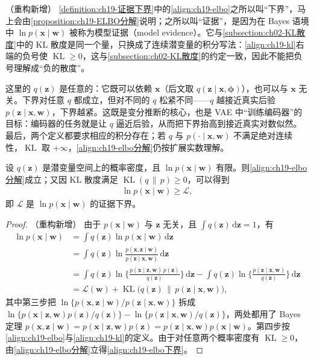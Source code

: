 \documentclass[../../main.tex]{subfiles}
\begin{document}
\begin{remark}（重构新增）
\cref{definition:ch19-证据下界}中的\eqref{align:ch19-elbo}之所以叫“下界”，马上会由\cref{proposition:ch19-ELBO分解}说明；之所以叫“证据”，是因为在 Bayes 语境中 $\ln p(\bm{x}\mid\bm{w})$ 被称为模型证据（model evidence）。它与\cref{subsection:ch02-KL散度}中的 KL 散度是同一个量，只换成了连续潜变量的积分写法：\eqref{align:ch19-kl}右端的负号使 $\operatorname{KL}\geqslant0$，这与\cref{subsection:ch02-KL散度}的约定一致，因此不能把负号理解成“负的散度”。

这里的 $q(\bm{z})$ 是任意的：它既可以依赖 $\bm{x}$（后文取 $q(\bm{z}\mid\bm{x},\bm{\phi})$），也可以与 $\bm{x}$ 无关。下界对任意 $q$ 都成立，但对不同的 $q$ 松紧不同——$q$ 越接近真实后验 $p(\bm{z}\mid\bm{x},\bm{w})$，下界越紧。这既是变分推断的核心，也是 VAE 中“训练编码器”的目标：编码器的任务就是让 $q$ 逼近后验，从而把下界抬高到接近真实对数似然。最后，两个定义都要求相应的积分存在；若 $q$ 与 $p(\cdot\mid\bm{x},\bm{w})$ 不满足绝对连续性，$\operatorname{KL}$ 取 $+\infty$，\eqref{align:ch19-elbo分解}仍按扩展实数理解。
\end{remark}

\begin{proposition}[证据下界分解]\label{proposition:ch19-ELBO分解}
设 $q(\bm{z})$ 是潜变量空间上的概率密度，且 $\ln p(\bm{x}\mid\bm{w})$ 有限。则\eqref{align:ch19-elbo分解}成立；又因 KL 散度满足 $\operatorname{KL}(q\,\|\,p)\geqslant0$，可以得到
\begin{align}
\ln p(\bm{x}\mid\bm{w})\geqslant\mathcal{L},
\label{align:ch19-elbo下界}
\end{align}
即 $\mathcal{L}$ 是 $\ln p(\bm{x}\mid\bm{w})$ 的证据下界。
\end{proposition}
\begin{proof}（重构新增）
由于 $p(\bm{x}\mid\bm{w})$ 与 $\bm{z}$ 无关，且 $\int q(\bm{z})\,\mathrm{d}\bm{z}=1$，有
\begin{align*}
\ln p(\bm{x}\mid\bm{w})&=\int q(\bm{z})\ln p(\bm{x}\mid\bm{w})\,\mathrm{d}\bm{z}\\
&=\int q(\bm{z})\ln\frac{p(\bm{x},\bm{z}\mid\bm{w})}{p(\bm{z}\mid\bm{x},\bm{w})}\,\mathrm{d}\bm{z}\\
&=\int q(\bm{z})\ln\Big\{\frac{p(\bm{x}\mid\bm{z},\bm{w})\,p(\bm{z})}{q(\bm{z})}\Big\}\,\mathrm{d}\bm{z}-\int q(\bm{z})\ln\Big\{\frac{p(\bm{z}\mid\bm{x},\bm{w})}{q(\bm{z})}\Big\}\,\mathrm{d}\bm{z}\\
&=\mathcal{L}(\bm{w})+\operatorname{KL}\big(q(\bm{z})\,\|\,p(\bm{z}\mid\bm{x},\bm{w})\big),
\end{align*}
其中第三步把 $\ln\{p(\bm{x},\bm{z}\mid\bm{w})/p(\bm{z}\mid\bm{x},\bm{w})\}$ 拆成 $\ln\{p(\bm{x}\mid\bm{z},\bm{w})p(\bm{z})/q(\bm{z})\}-\ln\{p(\bm{z}\mid\bm{x},\bm{w})/q(\bm{z})\}$，两处都用了 Bayes 定理 $p(\bm{x},\bm{z}\mid\bm{w})=p(\bm{x}\mid\bm{z},\bm{w})p(\bm{z})=p(\bm{z}\mid\bm{x},\bm{w})p(\bm{x}\mid\bm{w})$。第四步按\eqref{align:ch19-elbo}与\eqref{align:ch19-kl}的定义。由于对任意两个概率密度有 $\operatorname{KL}\geqslant0$，由\eqref{align:ch19-elbo分解}立得\eqref{align:ch19-elbo下界}。
\end{proof}
\end{document}
